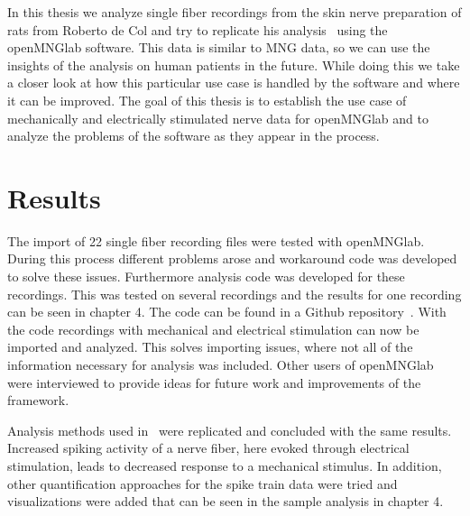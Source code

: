 In this thesis we analyze single fiber recordings from the skin nerve preparation of rats from Roberto de Col and try to replicate his analysis~\cite{roberto} using the openMNGlab software. This data is similar to MNG data, so we can use the insights of the analysis on human patients in the future. While doing this we take a closer look at how this particular use case is handled by the software and where it can be improved.
The goal of this thesis is to establish the use case of mechanically and electrically stimulated nerve data for openMNGlab and to analyze the problems of the software as they appear in the process.

\section{Results}
The import of 22 single fiber recording files were tested with openMNGlab. During this process different problems arose and workaround code was developed to solve these issues. Furthermore analysis code was developed for these recordings. This was tested on several recordings and the results for one recording can be seen in chapter 4. The code can be found in a Github repository~\cite{code}. With the code recordings with mechanical and electrical stimulation can now be imported and analyzed. This solves importing issues, where not all of the information necessary for analysis was included. Other users of openMNGlab were interviewed to provide ideas for future work and improvements of the framework.

Analysis methods used in~\cite{roberto} were replicated and concluded with the same results. Increased spiking activity of a nerve fiber, here evoked through electrical stimulation, leads to decreased response to a mechanical stimulus. In addition, other quantification approaches for the spike train data were tried and visualizations were added that can be seen in the sample analysis in chapter 4.

